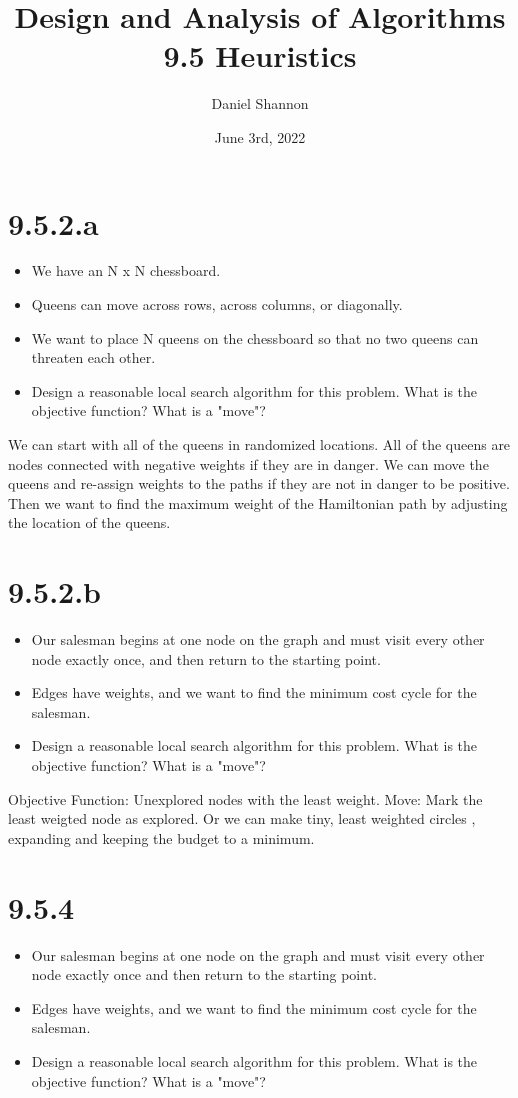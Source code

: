 \documentclass[12pt, letterpaper, twoside]{article}
\title{%
Design and Analysis of Algorithms\\
\large 9.5 Heuristics
}
\author{Daniel Shannon}
\date{June 3rd, 2022}
\begin{document}
\begin{titlepage}
\maketitle
\end{titlepage}

\section*{9.5.2.a}
\begin{itemize}
    \item We have an N x N chessboard.
    \item Queens can move across rows, across columns, or diagonally.
    \item We want to place N queens on the chessboard so that no two queens can threaten each other.
    \item Design a reasonable local search algorithm for this problem. What is the objective function? What is a "move"?
\end{itemize}

We can start with all of the queens in randomized locations. All of the queens are nodes connected with negative
weights if they are in danger. We can move the queens and re-assign weights to the paths if they are not in danger to be positive.
Then we want to find the maximum weight of the Hamiltonian path by adjusting the location of the queens.

\section*{9.5.2.b}
\begin{itemize}
    \item Our salesman begins at one node on the graph and must visit every other node exactly once, and then return to the starting point.
    \item Edges have weights, and we want to find the minimum cost cycle for the salesman.
    \item Design a reasonable local search algorithm for this problem. What is the objective function? What is a "move"?
\end{itemize}

Objective Function: Unexplored nodes with the least weight.
Move: Mark the least weigted node as explored. Or we can make tiny, least weighted circles , expanding and keeping the budget to a minimum.
\newpage
\section*{9.5.4}
\begin{itemize}
    \item Our salesman begins at one node on the graph and must visit every other node exactly once and then return to the starting point.
    \item Edges have weights, and we want to find the minimum cost cycle for the salesman.
    \item Design a reasonable local search algorithm for this problem. What is the objective function? What is a "move"?
\end{itemize}
\end{document}
